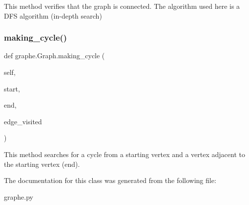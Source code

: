 \begin{DoxyVerb}This method verifies that the graph is connected. The algorithm used here is a DFS algorithm (in-depth search)
\end{DoxyVerb}
 \mbox{\label{classgraphe_1_1Graph_a9eae77f71af02fb458e27c17479dd326}} 
\subsubsection{\texorpdfstring{making\+\_\+cycle()}{making\_cycle()}}
{\footnotesize\ttfamily def graphe.\+Graph.\+making\+\_\+cycle (\begin{DoxyParamCaption}\item[{}]{self,  }\item[{}]{start,  }\item[{}]{end,  }\item[{}]{edge\+\_\+visited }\end{DoxyParamCaption})}

\begin{DoxyVerb}This method searches for a cycle from a starting vertex and a vertex adjacent to the starting vertex (end).
\end{DoxyVerb}
 

The documentation for this class was generated from the following file\+:\begin{DoxyCompactItemize}
\item 
graphe.\+py\end{DoxyCompactItemize}
